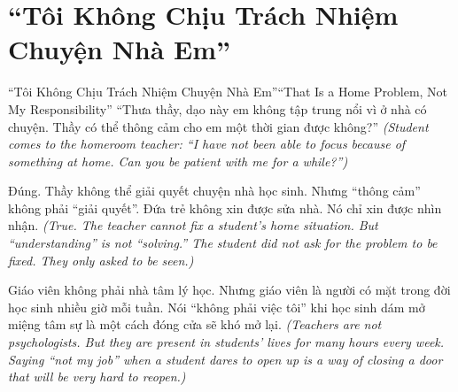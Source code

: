 \section{``Tôi Không Chịu Trách Nhiệm Chuyện Nhà Em''}
\begin{truyen}{``Tôi Không Chịu Trách Nhiệm Chuyện Nhà Em''}{``That Is a Home Problem, Not My Responsibility''}
 ``Thưa thầy, dạo này em không tập trung nổi vì ở nhà có chuyện. Thầy có thể thông cảm cho em một thời gian được không?''
\textit{(Student comes to the homeroom teacher: ``I have not been able to focus because of something at home. Can you be patient with me for a while?'')}


Đúng. Thầy không thể giải quyết chuyện nhà học sinh. Nhưng ``thông cảm'' không phải ``giải quyết''. Đứa trẻ không xin được sửa nhà. Nó chỉ xin được nhìn nhận.
\textit{(True. The teacher cannot fix a student's home situation. But ``understanding'' is not ``solving.'' The student did not ask for the problem to be fixed. They only asked to be seen.)}

\begin{baihoc}
Giáo viên không phải nhà tâm lý học. Nhưng giáo viên là người có mặt trong đời học sinh nhiều giờ mỗi tuần. Nói ``không phải việc tôi'' khi học sinh dám mở miệng tâm sự là một cách đóng cửa sẽ khó mở lại.
\textit{(Teachers are not psychologists. But they are present in students' lives for many hours every week. Saying ``not my job'' when a student dares to open up is a way of closing a door that will be very hard to reopen.)}
\end{baihoc}
\end{truyen}

